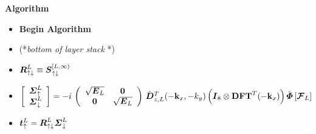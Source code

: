 \begin{figure}
{\begin{minipage} {140.0mm} {\bf  Algorithm}
\begin{itemize}
\end{itemize}

\begin{itemize}
\item{\bf Begin Algorithm}
\item  (*{\em bottom of layer stack\/ }*) 


\item ${\mbox{\boldmath$\mit R$\unboldmath}}_{ \uparrow \downarrow }^{L}\equiv 
{\mbox{\boldmath$\mit S$\unboldmath}}_{ \uparrow\downarrow }^{[L,\infty)}$

\item $
\left[{\begin{array}{c}{\mbox{\boldmath$\mit \Sigma$\unboldmath}}^{L}_{\uparrow}\\ 
{\mbox{\boldmath$\mit \Sigma$\unboldmath}}^{L}_{\downarrow}
\end{array}}\right]=-i\,\left({\begin{array}{cc}
\sqrt{{\mbox{\boldmath$\mit E$\unboldmath}}_{L}}&{\bf 0}\\ 
{\bf 0}&\sqrt{{\mbox{\boldmath$\mit E$\unboldmath}}_{L}}
\end{array}}\right)\,\hat{\mbox{\boldmath$\mit D$\unboldmath}}{}^{T}_{z,L}(-{\bf k}_{x},-{k}_{y})\left({\mbox{\boldmath$\mit I$\unboldmath}}_8\otimes
{\bf DFT}^{T}(-{\bf k}_{x})  \right)\hat{\mbox{\boldmath$\mit \Phi$\unboldmath}}\left[{\mbox{\boldmath$\cal F$\unboldmath}}_{L}  \right]
$

\item  $
{\mbox{\boldmath$\mit t$\unboldmath}}_{ \uparrow }^{L}=
{\mbox{\boldmath$\mit R$\unboldmath}}_{ \uparrow \downarrow }^{L}
{\mbox{\boldmath$\mit \Sigma$\unboldmath}}^{L}_{\downarrow}$


\end{itemize}

\vspace{2mm}

\end{minipage}
}
\end{figure}

